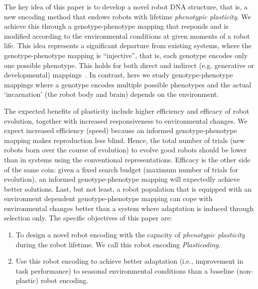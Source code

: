 \documentclass[utf8]{frontiersSCNS} %
\begin{document}
 
The key idea of this paper is to develop a novel robot DNA structure, that is, a new encoding method that endows robots with lifetime \textit{phenotypic plasticity}. We achieve this through a genotype-phenotype mapping that responds and is modified according to the environmental conditions at given moments of a robot life. This idea represents a significant departure from existing systems, where the genotype-phenotype mapping is \enquote{injective}, that is, each genotype encodes only one possible phenotype. This holds for both direct and indirect (e.g. generative or developmental) mappings~\citep{rothlauf2006representations}.  In contrast, here we study genotype-phenotype mappings where a genotype encodes multiple possible phenotypes and the actual `incarnation' (the robot body and brain) depends on the environment. %

The expected benefits of plasticity include higher efficiency and efficacy of robot evolution, together with increased responsiveness to environmental changes. We expect increased efficiency (speed) because an informed genotype-phenotype mapping makes reproduction less blind. Hence, the total number of trials (new robots born over the course of evolution) to evolve good robots should be lower than in systems using the conventional representations. Efficacy is the other side of the same coin: given a fixed search budget (maximum number of trials for evolution), an informed genotype-phenotype mapping will expectedly achieve better solutions. Last, but not least, a robot population that is equipped with an environment dependent genotype-phenotype mapping can cope with environmental changes better than a system where adaptation is induced through selection only. 
The specific objectives of this paper are: 
\begin{enumerate}

  \item  To design a novel robot encoding with the capacity of \textit{phenotypic plasticity} during the robot lifetime. We call this robot encoding \textit{Plasticoding}. 
  \item Use this robot encoding to achieve better adaptation (i.e., improvement in task performance) to seasonal environmental conditions than a baseline (non-plastic) robot encoding.
 
\end{enumerate}
\end{document}
